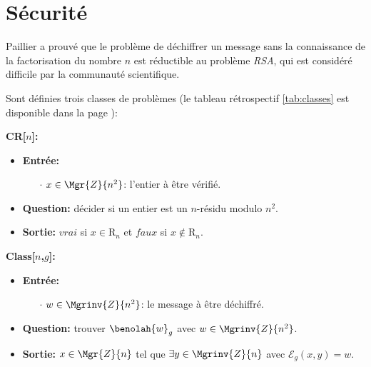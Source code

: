 \chapter{Sécurité}
\label{secu}
Paillier a prouvé que le problème de déchiffrer un message sans la con\-naissance 
de la factorisation du nombre $n$ est réductible au problème \emph{RSA}, qui est 
considéré difficile par la communauté scientifique. 

Sont définies trois classes de problèmes (le tableau rétrospectif \ref{tab:classes} est disponible dans la page \pageref{tab:classes}):

\begin{problem} \textbf{CR[$n$]:}%
	\begin{rm}
		\begin{itemize}	
		\renewcommand{\labelitemi}{}
		\item \textbf{Entrée:} 
			\begin{itemize}
				\item[$\cdot$] $x\in\Mgr{Z}{n^2}$: l'entier à être vérifié. 
			\end{itemize}
		\item \textbf{Question:} décider si un entier est un $n$-résidu modulo $n^2$.
		\item\textbf{Sortie:}
			$vrai$ si $x\in\mathrm{R}_n$ et $faux$ si $x\not\in\mathrm{R}_n$.
		\end{itemize}
	\end{rm}
\end{problem}


\begin{problem} \textbf{Class[$n$,$g$]:} %
	\begin{rm}
		\begin{itemize}	
		\renewcommand{\labelitemi}{}
		\item\textbf{Entrée:} 
			\begin{itemize}
				\item[$\cdot$] $w\in\Mgrinv{Z}{n^2}$: le message à être déchiffré.
			\end{itemize}
		\item\textbf{Question:} trouver $\benolah{w}_g$ avec $w \in \Mgrinv{Z}{n^2}$.
		\item\textbf{Sortie:}
			$x \in \Mgr{Z}{n}$ tel que $\exists y \in \Mgrinv{Z}{n}$ avec $\mathcal{E}_g(x,y) = w$.
		\end{itemize}
	\end{rm}
\end{problem}


